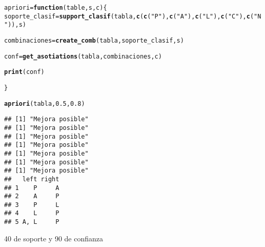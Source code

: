 \documentclass[12pt]{report}\usepackage[]{graphicx}\usepackage[dvipsnames]{xcolor}
\makeatletter
\newcommand{\hlnum}[1]{\textcolor[rgb]{0.686,0.059,0.569}{#1}}%
\newcommand{\hlstr}[1]{\textcolor[rgb]{0.192,0.494,0.8}{#1}}%
\newcommand{\hlstd}[1]{\textcolor[rgb]{0.345,0.345,0.345}{#1}}%
\newcommand{\hlkwa}[1]{\textcolor[rgb]{0.161,0.373,0.58}{\textbf{#1}}}%
\newcommand{\hlkwb}[1]{\textcolor[rgb]{0.69,0.353,0.396}{#1}}%
\newcommand{\hlkwc}[1]{\textcolor[rgb]{0.333,0.667,0.333}{#1}}%
\newcommand{\hlkwd}[1]{\textcolor[rgb]{0.737,0.353,0.396}{\textbf{#1}}}%
\newenvironment{kframe}{%
 \def\at@end@of@kframe{}%
 \ifinner\ifhmode%
  \def\at@end@of@kframe{\end{minipage}}%
  \begin{minipage}{\columnwidth}%
 \fi\fi%
 \def\FrameCommand##1{\hskip\@totalleftmargin \hskip-\fboxsep
 \colorbox{shadecolor}{##1}\hskip-\fboxsep
     \hskip-\linewidth \hskip-\@totalleftmargin \hskip\columnwidth}%
 \MakeFramed {\advance\hsize-\width
   \@totalleftmargin\z@ \linewidth\hsize
   \@setminipage}}%
 {\par\unskip\endMakeFramed%
 \at@end@of@kframe}
\newenvironment{knitrout}{}{} %
\makeatother
\begin{document}
\begin{knitrout}
\begin{kframe}
\begin{alltt}
\hlstd{apriori} \hlkwb{=} \hlkwa{function}\hlstd{(}\hlkwc{table}\hlstd{,} \hlkwc{s}\hlstd{,} \hlkwc{c}\hlstd{) \{}
\hlstd{soporte_clasif} \hlkwb{=} \hlkwd{support_clasif}\hlstd{(tabla,} \hlkwd{c}\hlstd{(}\hlkwd{c}\hlstd{(}\hlstr{"P"}\hlstd{),} \hlkwd{c}\hlstd{(}\hlstr{"A"}\hlstd{) ,}\hlkwd{c}\hlstd{(}\hlstr{"L"}\hlstd{),} \hlkwd{c}\hlstd{(}\hlstr{"C"}\hlstd{),} \hlkwd{c}\hlstd{(}\hlstr{"N"}\hlstd{)), s)}

\hlstd{combinaciones} \hlkwb{=} \hlkwd{create_comb}\hlstd{(tabla, soporte_clasif, s)}

\hlstd{conf} \hlkwb{=} \hlkwd{get_asotiations}\hlstd{(tabla, combinaciones, c)}

\hlkwd{print}\hlstd{(conf)}

\hlstd{\}}

\hlkwd{apriori}\hlstd{(tabla,} \hlnum{0.5}\hlstd{,} \hlnum{0.8}\hlstd{)}
\end{alltt}
\begin{verbatim}
## [1] "Mejora posible"
## [1] "Mejora posible"
## [1] "Mejora posible"
## [1] "Mejora posible"
## [1] "Mejora posible"
## [1] "Mejora posible"
## [1] "Mejora posible"
##   left right
## 1    P     A
## 2    A     P
## 3    P     L
## 4    L     P
## 5 A, L     P
\end{verbatim}
\end{kframe}
\end{knitrout}


40 de soporte y 90 de confianza
\end{document}
